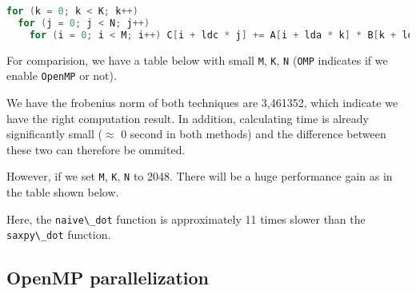 \documentclass[
  12pt,
  xcolor = usenames,dvipsnames]{article}
\newcommand{\passthrough}[1]{#1}
\begin{document}
\begin{lstlisting}[language=C]
for (k = 0; k < K; k++)
  for (j = 0; j < N; j++)
    for (i = 0; i < M; i++) C[i + ldc * j] += A[i + lda * k] * B[k + ldb * j];
\end{lstlisting}

For comparision, we have a table below with small \passthrough{\lstinline!M!}, \passthrough{\lstinline!K!}, \passthrough{\lstinline!N!} (\passthrough{\lstinline!OMP!} indicates if we enable \passthrough{\lstinline!OpenMP!} or not).

\begin{table}[!h]
\centering
{}
\end{table}

We have the frobenius norm of both techniques are 3,461352, which indicate we have the right computation result. In addition, calculating time is already significantly small (\(\approx\) 0 second in both methods) and the difference between these two can therefore be ommited.

However, if we set \passthrough{\lstinline!M!}, \passthrough{\lstinline!K!}, \passthrough{\lstinline!N!} to 2048. There will be a huge performance gain as in the table shown below.

\begin{table}[!h]
\centering
{}
\end{table}

Here, the \passthrough{\lstinline!naive\_dot!} function is approximately 11 times slower than the \passthrough{\lstinline!saxpy\_dot!} function.

\hypertarget{openmp-parallelization}{%
\subsection{OpenMP parallelization}\label{openmp-parallelization}}
\end{document}
